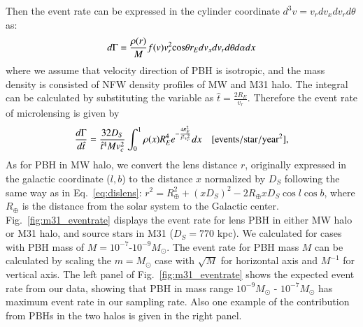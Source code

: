 \documentclass[iop, apj]{emulateapj}
\newcommand{\?}{\stackrel{?}{=}}
\begin{document}
%
Then the event rate can be expressed in the cylinder coordinate $d^3 v=v_r dv_x dv_r d\theta$ as: \citep{Griestetal:91}
%
\begin{eqnarray}
d\Gamma=\frac{\rho(r)}{M}f(v)v^2_r {\rm cos}\theta r_E dv_xdv_rd\theta d\alpha dx %
\end{eqnarray}
%
where we assume that velocity direction of PBH is isotropic, and the mass density is consisted of 
NFW density profiles of MW and M31 halo. The integral can be calculated by substituting the variable as $\hat t=\frac{2R_E}{v_r}$. Therefore the event rate of microlensing is given by 
%
\begin{eqnarray}
\frac{d\Gamma}{d\hat t}=\frac{32D_S}{\hat t^4 Mv_c^2}\int^1_0 \rho(x) R^4_E e^{-\frac{4R^2_E}{\hat t^2 v^2_c}} dx \quad[\rm {events/star/year^2}],
\label{eq:evrate}
\end{eqnarray}
%
As for PBH in MW halo, we convert the lens distance $r$, originally expressed in the galactic coordinate ($l,b$) to the distance $x$ normalized by $D_S$ following the same way as in Eq.~\ref{eq:dislens}: $r^2=R^2_\oplus+(xD_S)^2-2R_\oplus xD_S{\cos}l{\cos}b$, where $R_\oplus$ is the distance from the solar system to the Galactic center. 
Fig.~\ref{fig:m31_eventrate} displays the event rate for lens PBH in either MW halo or M31 halo, and source stars in M31 ($D_S=770$ {kpc}). We calculated for cases with PBH mass of $M=10^{-7}$-$10^{-9}M_\odot$. The event rate for PBH mass $M$ can be calculated by scaling the $m=M_\odot$ case with $\sqrt{M}$ for horizontal axis and $M^{-1}$ for vertical axis. The left panel of Fig.~\ref{fig:m31_eventrate} shows the expected event rate from our data, showing that PBH in mass range $10^{-9}M_\odot$ - $10^{-7}M_\odot$ has maximum event rate in our sampling rate. Also one example of the contribution from PBHs in the two halos is given in the right panel. 
%
\end{document}
